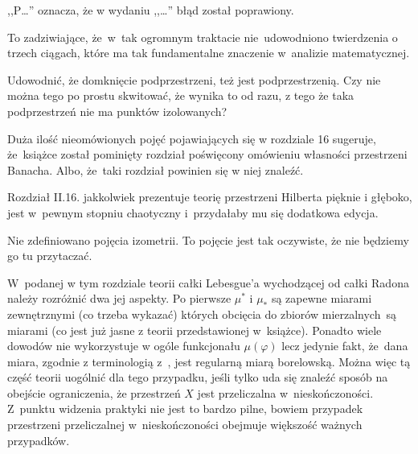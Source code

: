 \documentclass[a4paper,11pt]{article}
\newcommand{\vp}{\varphi}
\begin{document}




\vspace{\spaceTwo} \vspace{\spaceThree}




,,P\ldots'' oznacza, że w wydaniu ,,\ldots'' błąd został poprawiony. \\






\start To zadziwiające, że~w~tak ogromnym traktacie nie~udowodniono
twierdzenia o trzech ciągach, które ma tak fundamentalne znaczenie
w~analizie matematycznej.
  
\start Udowodnić, że domknięcie podprzestrzeni, też jest
podprzestrzenią. Czy nie można tego po prostu skwitować, że wynika to
od razu, z tego że taka podprzestrzeń nie ma punktów izolowanych?
  
\start Duża ilość nieomówionych pojęć pojawiających się w rozdziale 16
sugeruje, że~książce został pominięty rozdział poświęcony omówieniu
własności przestrzeni Banacha. Albo, że~taki rozdział powinien się w
niej znaleźć.
  
\start Rozdział II.16. jakkolwiek prezentuje teorię przestrzeni
Hilberta pięknie i głęboko, jest w~pewnym stopniu chaotyczny
i~przydałaby mu się dodatkowa edycja.
  
\start Nie zdefiniowano pojęcia izometrii. To pojęcie jest tak
oczywiste, że nie będziemy go tu przytaczać.

\vspace{\spaceTwo}

\noi {}

\vspace{\spaceThree}

\start W~podanej w tym rozdziale teorii całki Lebesgue'a wychodzącej
od całki Radona należy rozróżnić dwa jej aspekty. Po pierwsze
$\mu^{ * }$ i $\mu_{ * }$ są zapewne miarami zewnętrznymi (co trzeba
wykazać) których obcięcia do zbiorów mierzalnych~są miarami (co jest
już jasne z teorii przedstawionej w~książce). Ponadto wiele dowodów
nie wykorzystuje w ogóle funkcjonału $\mu( \vp )$ lecz jedynie fakt,
że~dana miara, zgodnie z terminologią z~\cite{Rud86}, jest regularną
miarą borelowską. Można więc tą część teorii uogólnić dla tego
przypadku, jeśli tylko uda się znaleźć sposób na obejście
ograniczenia, że przestrzeń $X$ jest przeliczalna w~nieskończoności.
Z~punktu widzenia praktyki nie jest to bardzo pilne, bowiem przypadek
przestrzeni przeliczalnej w~nieskończoności obejmuje większość ważnych
przypadków.
\end{document}
